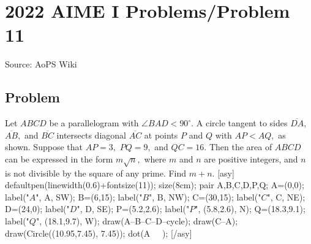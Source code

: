 \documentclass[12pt]{article}
\begin{document}
\section*{{2022 AIME I Problems/Problem 11}}
Source: AoPS Wiki

\subsection*{Problem}
Let $ABCD$ be a parallelogram with $\angle BAD < 90^\circ.$ A circle tangent to sides $\overline{DA},$ $\overline{AB},$ and $\overline{BC}$ intersects diagonal $\overline{AC}$ at points $P$ and $Q$ with $AP < AQ,$ as shown. Suppose that $AP=3,$ $PQ=9,$ and $QC=16.$ Then the area of $ABCD$ can be expressed in the form $m\sqrt{n},$ where $m$ and $n$ are positive integers, and $n$ is not divisible by the square of any prime. Find $m+n.$ [asy] defaultpen(linewidth(0.6)+fontsize(11)); size(8cm); pair A,B,C,D,P,Q; A=(0,0); label("$A$", A, SW); B=(6,15); label("$B$", B, NW); C=(30,15); label("$C$", C, NE); D=(24,0); label("$D$", D, SE); P=(5.2,2.6); label("$P$", (5.8,2.6), N); Q=(18.3,9.1); label("$Q$", (18.1,9.7), W); draw(A--B--C--D--cycle); draw(C--A); draw(Circle((10.95,7.45), 7.45)); dot(A^^B^^C^^D^^P^^Q); [/asy]
\end{document}
